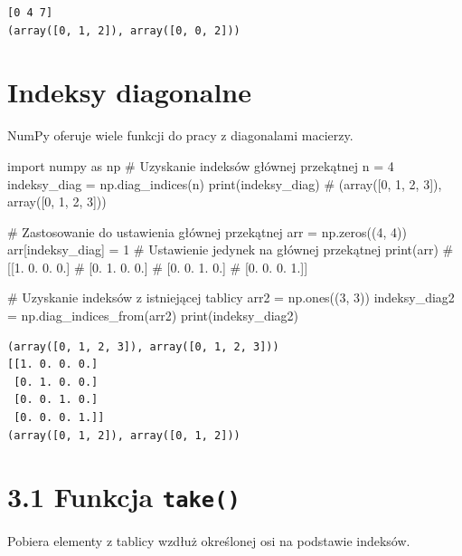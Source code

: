 \documentclass[
  polish,
  letterpaper,
  DIV=11,
  numbers=noendperiod]{scrreprt}
\newenvironment{Shaded}{\begin{snugshade}}{\end{snugshade}}
\newcommand{\BuiltInTok}[1]{\textcolor[rgb]{0.00,0.23,0.31}{#1}}
\newcommand{\CommentTok}[1]{\textcolor[rgb]{0.37,0.37,0.37}{#1}}
\newcommand{\DecValTok}[1]{\textcolor[rgb]{0.68,0.00,0.00}{#1}}
\newcommand{\ImportTok}[1]{\textcolor[rgb]{0.00,0.46,0.62}{#1}}
\newcommand{\NormalTok}[1]{\textcolor[rgb]{0.00,0.23,0.31}{#1}}
\newcommand{\OperatorTok}[1]{\textcolor[rgb]{0.37,0.37,0.37}{#1}}
\begin{document}
\begin{verbatim}
[0 4 7]
(array([0, 1, 2]), array([0, 0, 2]))
\end{verbatim}

\section{Indeksy diagonalne}\label{indeksy-diagonalne}

NumPy oferuje wiele funkcji do pracy z diagonalami macierzy.

\begin{Shaded}
\begin{Highlighting}[]
\ImportTok{import}\NormalTok{ numpy }\ImportTok{as}\NormalTok{ np}
\CommentTok{\# Uzyskanie indeksów głównej przekątnej}
\NormalTok{n }\OperatorTok{=} \DecValTok{4}
\NormalTok{indeksy\_diag }\OperatorTok{=}\NormalTok{ np.diag\_indices(n)}
\BuiltInTok{print}\NormalTok{(indeksy\_diag)  }\CommentTok{\# (array([0, 1, 2, 3]), array([0, 1, 2, 3]))}

\CommentTok{\# Zastosowanie do ustawienia głównej przekątnej}
\NormalTok{arr }\OperatorTok{=}\NormalTok{ np.zeros((}\DecValTok{4}\NormalTok{, }\DecValTok{4}\NormalTok{))}
\NormalTok{arr[indeksy\_diag] }\OperatorTok{=} \DecValTok{1}  \CommentTok{\# Ustawienie jedynek na głównej przekątnej}
\BuiltInTok{print}\NormalTok{(arr)}
\CommentTok{\# [[1. 0. 0. 0.]}
\CommentTok{\#  [0. 1. 0. 0.]}
\CommentTok{\#  [0. 0. 1. 0.]}
\CommentTok{\#  [0. 0. 0. 1.]]}

\CommentTok{\# Uzyskanie indeksów z istniejącej tablicy}
\NormalTok{arr2 }\OperatorTok{=}\NormalTok{ np.ones((}\DecValTok{3}\NormalTok{, }\DecValTok{3}\NormalTok{))}
\NormalTok{indeksy\_diag2 }\OperatorTok{=}\NormalTok{ np.diag\_indices\_from(arr2)}
\BuiltInTok{print}\NormalTok{(indeksy\_diag2)}
\end{Highlighting}
\end{Shaded}

\begin{verbatim}
(array([0, 1, 2, 3]), array([0, 1, 2, 3]))
[[1. 0. 0. 0.]
 [0. 1. 0. 0.]
 [0. 0. 1. 0.]
 [0. 0. 0. 1.]]
(array([0, 1, 2]), array([0, 1, 2]))
\end{verbatim}

\section{\texorpdfstring{3.1 Funkcja
\texttt{take()}}{3.1 Funkcja take()}}\label{funkcja-take}

Pobiera elementy z tablicy wzdłuż określonej osi na podstawie indeksów.
\end{document}
